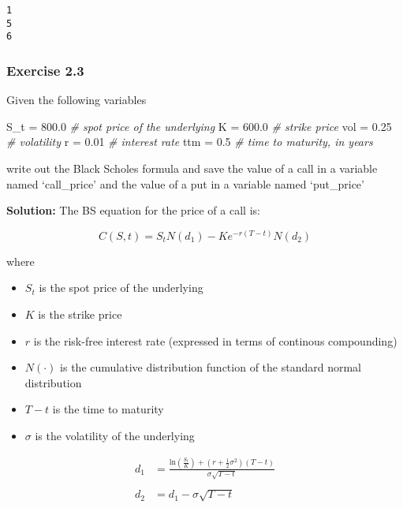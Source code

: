 \documentclass[11pt]{article}
\newenvironment{Shaded}{}{}
\newcommand{\FloatTok}[1]{\textcolor[rgb]{0.25,0.63,0.44}{{#1}}}
\newcommand{\CommentTok}[1]{\textcolor[rgb]{0.38,0.63,0.69}{\textit{{#1}}}}
\newcommand{\NormalTok}[1]{{#1}}
\newcommand{\OperatorTok}[1]{\textcolor[rgb]{0.40,0.40,0.40}{{#1}}}
\begin{document}
    \begin{Verbatim}[commandchars=\\\{\}]
1
5
6

    \end{Verbatim}

    \hypertarget{exercise-2.3}{%
\subsubsection{Exercise 2.3}\label{exercise-2.3}}

Given the following variables

\begin{Shaded}
\begin{Highlighting}[]
\NormalTok{S_t }\OperatorTok{=} \FloatTok{800.0} \CommentTok{# spot price of the underlying}
\NormalTok{K }\OperatorTok{=} \FloatTok{600.0} \CommentTok{# strike price}
\NormalTok{vol }\OperatorTok{=} \FloatTok{0.25} \CommentTok{# volatility}
\NormalTok{r }\OperatorTok{=} \FloatTok{0.01} \CommentTok{# interest rate}
\NormalTok{ttm }\OperatorTok{=} \FloatTok{0.5} \CommentTok{# time to maturity, in years}
\end{Highlighting}
\end{Shaded}

write out the Black Scholes formula and save the value of a call in a
variable named `call\_price' and the value of a put in a variable named
`put\_price'

\textbf{Solution:} The BS equation for the price of a call is:

\[ C(S, t) = S_tN(d_1)-Ke^{-r(T-t)}N(d_2) \]

where
\begin{itemize}
\item \(S_t\) is the spot price of the underlying
\item \(K\) is the strike price
\item \(r\) is the risk-free interest rate (expressed in terms of continous compounding)
\item \(N(\cdot)\) is the cumulative distribution function of the standard normal distribution
\item \(T - t\) is the time to maturity
\item \(\sigma\) is the volatility of the underlying
\end{itemize}

\[\begin{split}
d_1 & = \frac{\mathrm{ln}(\frac{S_t}{K}) + (r + \frac{1}{2}\sigma^{2})(T-t)}{\sigma\sqrt{T-t}}\\ \\
d_2 & = d_1 - \sigma\sqrt{T-t}\\
\end{split}\]
\end{document}
